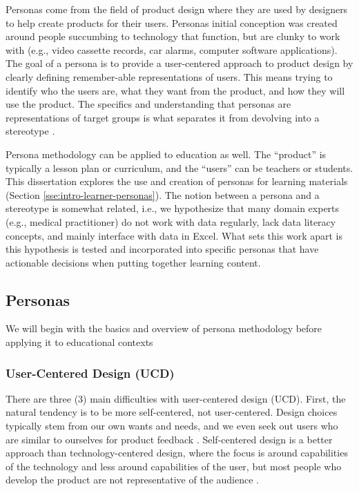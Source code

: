 \documentclass[010-intro.tex]{subfiles}
\begin{document}
Personas come from the field of product design
where they are used by designers to help create products for their users.
Personas initial conception was created around people succumbing to technology that
function, but are clunky to work with
(e.g., video cassette records, car alarms, computer software applications).
The goal of a persona is to provide a user-centered approach to product design
by clearly defining remember-able representations of users.
This means trying to identify who the users are,
what they want from the product, and
how they will use the product.
The specifics and understanding that personas are representations of target groups
is what separates it from devolving into a stereotype
\cite{pruittPersonaLifecycleKeeping2006}.

Persona methodology can be applied to education as well.
The ``product'' is typically a lesson plan or curriculum,
and the ``users'' can be teachers
\cite{zagallo2019through}
or students.
This dissertation explores the use and creation of personas for learning materials
(Section \ref{sse:intro-learner-personas}).
The notion between a persona and a stereotype is somewhat related,
i.e., we hypothesize that many domain experts (e.g., medical practitioner)
do not work with data regularly,
lack data literacy concepts,
and mainly interface with data in Excel.
What sets this work apart is this hypothesis is tested and incorporated into specific
personas that have actionable decisions when putting together learning content.

\subsection{Personas}

We will begin with the basics and overview of persona methodology
before applying it to educational contexts

    \subsubsection{User-Centered Design (UCD)}

        There are three (3) main difficulties with user-centered design (UCD).
        First,
        the natural tendency is to be more self-centered, not user-centered.
            Design choices typically stem from our own wants and needs,
            and we even seek out users who are similar to ourselves for product feedback
            \cite{pruittPersonaLifecycleKeeping2006, tognazziniTogSoftwareDesign1748}.
            Self-centered design is a better approach than technology-centered design,
            where the focus is around capabilities of the technology and less around capabilities of the user,
            but most people who develop the product are not representative of the audience
            \cite{pruittPersonaLifecycleKeeping2006}.
\end{document}

